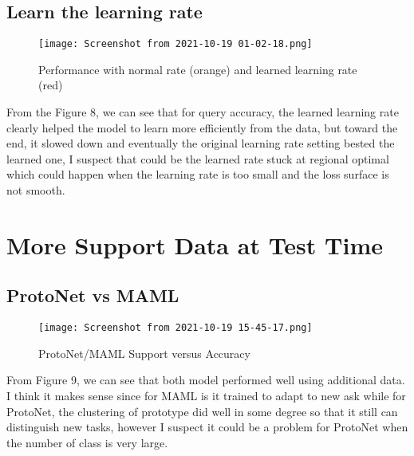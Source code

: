 \documentclass[]{article}
\begin{document}
	\subsection{Learn the learning rate}
	\begin{center} 
		\begin{figure}[H]
			\centering
			\texttt{[image: Screenshot from 2021-10-19 01-02-18.png]}
			\caption{Performance with normal rate (orange) and learned learning rate (red)}
		\end{figure}
	\end{center}
	From the Figure 8, we can see that for query accuracy, the learned learning rate clearly helped the model to learn more efficiently from the data, but toward the end, it slowed down and eventually the original learning rate setting bested the learned one, I suspect that could be the learned rate stuck at regional optimal which could happen when the learning rate is too small and the loss surface is not smooth. 
	
	\section{More Support Data at Test Time}
	\subsection{ProtoNet vs MAML}
	\begin{center} 
		\begin{figure}[H]
			\centering
			\texttt{[image: Screenshot from 2021-10-19 15-45-17.png]}
			\caption{ProtoNet/MAML Support versus Accuracy}
		\end{figure}
	\end{center}
	From Figure 9, we can see that both model performed well using additional data. I think it makes sense since for MAML is it trained to adapt to new ask while for ProtoNet, the clustering of prototype did well in some degree so that it still can distinguish new tasks, however I suspect it could be a problem for ProtoNet when the number of class is very large.
	
	
	
	
	
\end{document}
